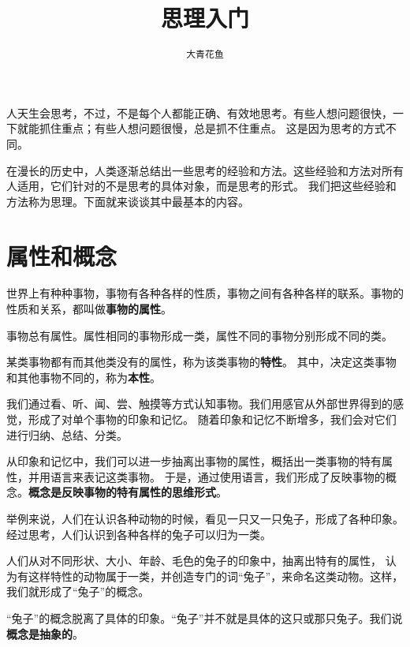 \documentclass[12pt,UTF8,a4paper]{article}
\title{\zihao{0} \bfseries 思理入门}
\author{\zihao{2} \texttt{大青花鱼}}
\date{}
\begin{document}
\maketitle
\lhead{}%
\chead{}%
\rhead{}%
\lfoot{}%
\cfoot{\thepage}%
\rfoot{}%

人天生会思考，不过，不是每个人都能正确、有效地思考。有些人想问题很快，一下就能抓住重点；有些人想问题很慢，总是抓不住重点。
这是因为思考的方式不同。

在漫长的历史中，人类逐渐总结出一些思考的经验和方法。这些经验和方法对所有人适用，它们针对的不是思考的具体对象，而是思考的形式。
我们把这些经验和方法称为思理。下面就来谈谈其中最基本的内容。

\clearpage

\tableofcontents

\clearpage

\section{属性和概念}

世界上有种种事物，事物有各种各样的性质，事物之间有各种各样的联系。事物的性质和关系，都叫做\textbf{事物的属性}。

事物总有属性。属性相同的事物形成一类，属性不同的事物分别形成不同的类。

某类事物都有而其他类没有的属性，称为该类事物的\textbf{特性}。
其中，决定这类事物和其他事物不同的，称为\textbf{本性}。

我们通过看、听、闻、尝、触摸等方式认知事物。我们用感官从外部世界得到的感觉，形成了对单个事物的印象和记忆。
随着印象和记忆不断增多，我们会对它们进行归纳、总结、分类。

从印象和记忆中，我们可以进一步抽离出事物的属性，概括出一类事物的特有属性，并用语言来表记这类事物。
于是，通过使用语言，我们形成了反映事物的概念。\textbf{概念是反映事物的特有属性的思维形式}。

举例来说，人们在认识各种动物的时候，看见一只又一只兔子，形成了各种印象。
经过思考，人们认识到各种各样的兔子可以归为一类。

人们从对不同形状、大小、年龄、毛色的兔子的印象中，抽离出特有的属性，
认为有这样特性的动物属于一类，并创造专门的词“兔子”，来命名这类动物。这样，我们就形成了“兔子”的概念。

“兔子”的概念脱离了具体的印象。“兔子”并不就是具体的这只或那只兔子。我们说\textbf{概念是抽象的}。
\end{document}
